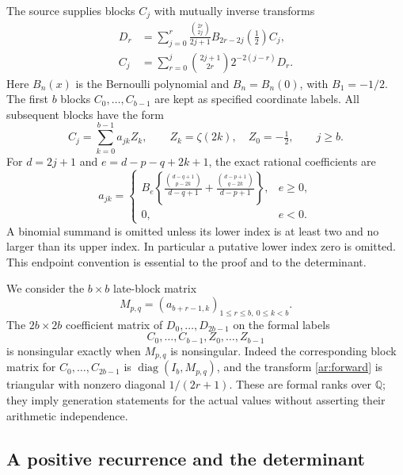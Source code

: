 \documentclass[11pt,a4paper]{article}
\numberwithin{equation}{section}
\theoremstyle{definition}
\theoremstyle{remark}
\begin{document}
The source supplies blocks $C_j$ with mutually inverse transforms
\begin{align}
 D_r&=\sum_{j=0}^r
    \frac{\binom{2r}{2j}}{2j+1}B_{2r-2j}(\tfrac12)C_j,
       \label{ar:forward}\\
 C_j&=\sum_{r=0}^j
       \binom{2j+1}{2r}2^{-2(j-r)}D_r.
       \label{ar:backward}
\end{align}
Here $B_n(x)$ is the Bernoulli polynomial and $B_n=B_n(0)$, with
$B_1=-1/2$. The first $b$ blocks $C_0,\ldots,C_{b-1}$ are kept as
specified coordinate labels. All subsequent blocks have the form
\begin{equation}\label{ar:block}
 C_j=\sum_{k=0}^{b-1}a_{jk}Z_k,\qquad
 Z_k=\zeta(2k),\quad Z_0=-\tfrac12,\qquad j\ge b.
\end{equation}
For $d=2j+1$ and $e=d-p-q+2k+1$, the exact rational coefficients are
\begin{equation}\label{ar:entries}
 a_{jk}=\begin{cases}
 B_e\left\{
 \displaystyle\frac{\binom{d-q+1}{p-2k}}{d-q+1}
 +\displaystyle\frac{\binom{d-p+1}{q-2k}}{d-p+1}
 \right\},&e\ge0,\\[6pt]
 0,&e<0.
 \end{cases}
\end{equation}
A binomial summand is omitted unless its lower index is at least two
and no larger than its upper index. In particular a putative lower
index zero is omitted. This endpoint convention is essential to the
proof and to the determinant.

We consider the $b\times b$ late-block matrix
\begin{equation}\label{ar:M}
 M_{p,q}=(a_{b+r-1,k})_{1\le r\le b,\ 0\le k<b}.
\end{equation}
The $2b\times2b$ coefficient matrix of
$D_0,\ldots,D_{2b-1}$ on the formal labels
\[
           C_0,\ldots,C_{b-1},Z_0,\ldots,Z_{b-1}
\]
is nonsingular exactly when $M_{p,q}$ is nonsingular. Indeed the
corresponding block matrix for $C_0,\ldots,C_{2b-1}$ is
$\operatorname{diag}(I_b,M_{p,q})$, and the transform
\eqref{ar:forward} is triangular with nonzero diagonal
$1/(2r+1)$. These are formal ranks over $\mathbb Q$; they imply
generation statements for the actual values without asserting their
arithmetic independence.

\subsection{A positive recurrence and the determinant}
\end{document}
